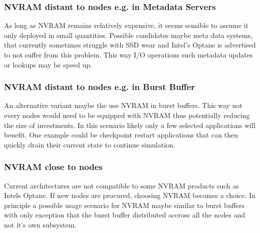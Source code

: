 \documentclass{../../template/esiwace-report}
\begin{document}
\subsubsection{NVRAM distant to nodes e.g. in Metadata Servers}
As long as NVRAM remains relatively expensive, it seems sensible to assume it only deployed in small quantities.
Possible candidates maybe meta data systems, that currently sometimes struggle with SSD wear and Intel's Optane is advertised to not suffer from this problem. This way I/O operations such metadata updates or lookups may be speed up.

\subsubsection{NVRAM distant to nodes e.g. in Burst Buffer}
An alternative variant maybe the use NVRAM in burst buffers.
This way not every nodes would need to be equipped with NVRAM thus potentially reducing the size of investments.
In this scenario likely only a few selected applications will benefit.
One example could be checkpoint restart applications that can then quickly drain their current state to continue simulation.

\subsubsection{NVRAM close to nodes}
Current architectures are not compatible to some NVRAM products such as Intels Optane.
If new nodes are procured, choosing NVRAM becomes a choice.
In principle a possible usage scenario for NVRAM maybe similar to burst buffers with only exception that the burst buffer distributed accross all the nodes and not it's own subsystem.
\end{document}
